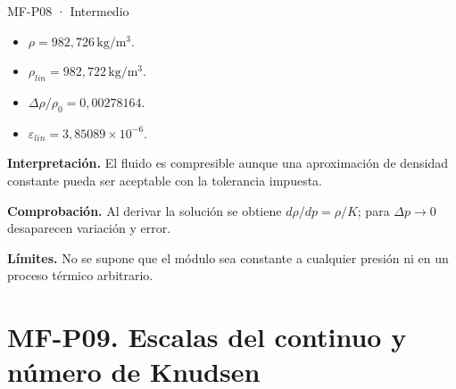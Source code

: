 \begin{studiumworked}{MF-P08 · Intermedio}
\begin{itemize}
\item $\rho=982{,}726\,\mathrm{kg/m^3}$.

\item $\rho_{lin}=982{,}722\,\mathrm{kg/m^3}$.

\item $\Delta\rho/\rho_0=0{,}00278164$.

\item $\varepsilon_{lin}=3{,}85089\times10^{-6}$.

\end{itemize}

\textbf{Interpretación.} El fluido es compresible aunque una aproximación de densidad constante pueda ser aceptable con la tolerancia impuesta.

\textbf{Comprobación.} Al derivar la solución se obtiene $d\rho/dp=\rho/K$; para $\Delta p\to0$ desaparecen variación y error.

\textbf{Límites.} No se supone que el módulo sea constante a cualquier presión ni en un proceso térmico arbitrario.

\end{studiumworked}



\Needspace{.30\textheight}\section{MF-P09. Escalas del continuo y número de Knudsen}

